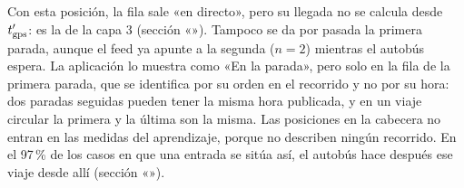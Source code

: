 Con esta posición, la fila sale «en directo», pero su llegada no se calcula desde $t_{\mathrm{gps}}'$: es la de la capa 3
(sección «»). Tampoco se da por pasada la primera parada, aunque el feed ya apunte a la
segunda ($n=2$) mientras el autobús espera. La aplicación lo muestra como «En la parada», pero solo en la fila de la
primera parada, que se identifica por su orden en el recorrido y no por su hora: dos paradas seguidas pueden tener la
misma hora publicada, y en un viaje circular la primera y la última son la misma. Las posiciones en la cabecera no
entran en las medidas del aprendizaje, porque no describen ningún recorrido. En el 97\,\% de los casos en que una
entrada se sitúa así, el autobús hace después ese viaje desde allí (sección «»).


